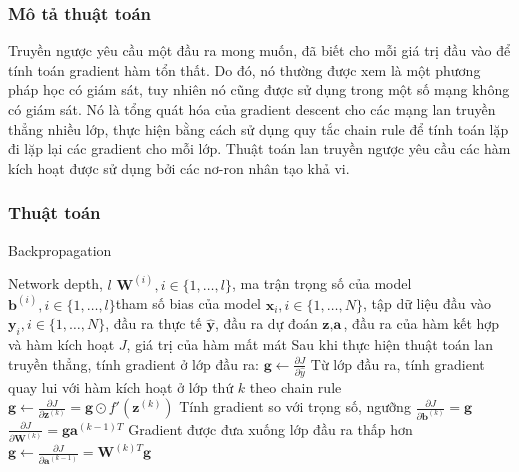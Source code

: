 \subsubsection{Mô tả thuật toán}
Truyền ngược yêu cầu một đầu ra mong muốn, đã biết cho mỗi giá trị đầu vào để tính toán gradient hàm tổn thất. Do đó, nó thường được xem là một phương pháp học có giám sát, tuy nhiên nó cũng được sử dụng trong một số mạng không có giám sát. Nó là tổng quát hóa của gradient descent cho các mạng lan truyền thẳng nhiều lớp, thực hiện bằng cách sử dụng quy tắc chain rule để tính toán lặp đi lặp lại các gradient cho mỗi lớp. Thuật toán lan truyền ngược yêu cầu các hàm kích hoạt được sử dụng bởi các nơ-ron nhân tạo khả vi.
\subsubsection{Thuật toán}

\begin{algorithm}[H]
\caption{Backpropagation }\label{al:forward}
\begin{algorithmic}
\REQUIRE Network depth, $l$
\REQUIRE $\textbf{W}^{(i)}, i \in \{1,\ldots,l\}$, ma trận trọng số của model
\REQUIRE $\textbf{b}^{(i)}, i\in \{1,\ldots,l\}$tham số bias của model
\REQUIRE $ \textbf{x}_i, i \in \{1,\ldots,N\} $, tập dữ liệu đầu vào
\REQUIRE $\textbf{y}_i,i \in \{1,\ldots,N\} $, đầu ra thực tế
\REQUIRE ${\widehat{\textbf{y}}}$, đầu ra dự đoán
\REQUIRE $\textbf{z},\textbf{a}$, đầu ra của hàm kết hợp và hàm kích hoạt
\REQUIRE $J$, giá trị của hàm mất mát
\STATE Sau khi thực hiện thuật toán lan truyền thẳng, tính gradient ở lớp đầu ra:
\STATE $\textbf{g} \gets \frac{\partial J}{\partial\widehat{y}} $
	\STATE Từ lớp đầu ra, tính gradient quay lui với hàm kích hoạt ở lớp thứ $k$ theo chain rule
	\STATE $\textbf{g} \gets \frac{\partial J}{\partial \textbf{z}^{(k)}} = \textbf{g} \odot f'(\textbf{z}^{(k)})$
	\STATE Tính gradient so với trọng số, ngưỡng
	\STATE $\frac{\partial J}{\partial \textbf{b}^{(k)}} = \textbf{g}$
	\STATE $\frac{\partial J}{\partial \textbf{W}^{(k)}} = \textbf{g}\textbf{a}^{(k-1)T}$
	\STATE Gradient được đưa xuống lớp đầu ra thấp hơn
	\STATE $\textbf{g} \gets \frac{\partial J}{\partial \textbf{a}^{(k-1)}} = \textbf{W}^{(k)T}\textbf{g} $
\ENDFOR
\end{algorithmic}
\end{algorithm}

